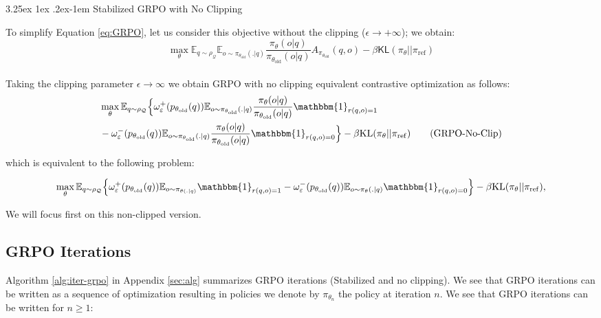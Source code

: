 \documentclass[11pt,reqno]{amsart}
\makeatletter
\providecommand\paragraph{\@startsection{paragraph}{4}{\z@}%
  {3.25ex \@plus1ex \@minus.2ex}{-1em}%
  {\normalfont\normalsize\bfseries}}
\makeatother
\begin{document}
 \paragraph{Stabilized GRPO with No Clipping}
 
 \noindent To simplify Equation \ref{eq:GRPO}, let us consider this objective without the clipping ($\epsilon \to + \infty$); we obtain:
\begin{equation}
\max_{\theta} \mathbb{E}_{q\sim \rho_{\mathcal{Q}}} \mathbb{E}_{o\sim \pi_{\theta_{\text{old}}} (. |q) }\frac{\pi_{\theta} (o| q )}{\pi_{\theta_{\text{old}}}(o| q) } A_{\pi_{\theta_{\text{old}}}}(q,o) - \beta \mathsf{KL} (\pi_{\theta} || \pi_{\mathrm{ref}}) 
\label{eq:GRPO-noClip}
\tag{GRPO}
\end{equation}
~~\\
 Taking the clipping parameter $\epsilon \to \infty$ we obtain GRPO with no clipping equivalent contrastive optimization as follows: 
 \begin{align}
&  \max_{\theta}  \mathbb{E}_{q\sim \rho_{\mathcal{Q}}}  \Big \{  \omega^+_{\varepsilon} (p_{\theta_{\text{old}}}(q) )\mathbb{E}_{o\sim \pi_{\theta_{\text{old}}} (. |q) } \frac{\pi_{\theta} (o| q )}{\pi_{\theta_{\text{old}}}(o| q)}\mathbbm{1}_{r(q,o)=1}\nonumber\\
& -  \omega^-_{\varepsilon} (p_{\theta_{\text{old}}}(q) ) \mathbb{E}_{o\sim \pi_{\theta_{\text{old}}} (. |q) } \frac{\pi_{\theta} (o| q )}{\pi_{\theta_{\text{old}}}(o| q)} \mathbbm{1}_{r(q,o)=0}  \Big \}- \beta \mathrm{KL} (\pi_{\theta} || \pi_{\mathrm{ref}}) 
\label{eq:CLGRPOnoClip}
\tag{GRPO-No-Clip}
\end{align}

\noindent which is equivalent to the following problem: 

\begin{equation}
 \max_{\theta}  \mathbb{E}_{q\sim \rho_{\mathcal{Q}}} \Big \{  \omega^+_{\varepsilon}(p_{\theta_{\text{old}}}(q))  \mathbb{E}_{o\sim \pi_{\theta(. |q) } }\mathbbm{1}_{r(q,o)=1}
- \omega^-_{\varepsilon}(p_{\theta_{\text{old}}}(q)) \mathbb{E}_{o\sim \pi_{\theta} (. |q) } \mathbbm{1}_{r(q,o)=0} \Big\} - \beta \mathrm{KL} (\pi_{\theta} || \pi_{\mathrm{ref}}), 
\label{eq:GRPOnoClip}
\end{equation}


We will focus first  on this non-clipped  version.

\subsection{GRPO Iterations} Algorithm \ref{alg:iter-grpo} in Appendix \ref{sec:alg}  summarizes GRPO iterations (Stabilized and no clipping). We see that  GRPO iterations can be written as a sequence  of optimization resulting in policies we  denote by $\pi_{\theta_n}$ the policy at iteration $n$.  We see that GRPO iterations  can be written for $n\geq 1$:
\end{document}
